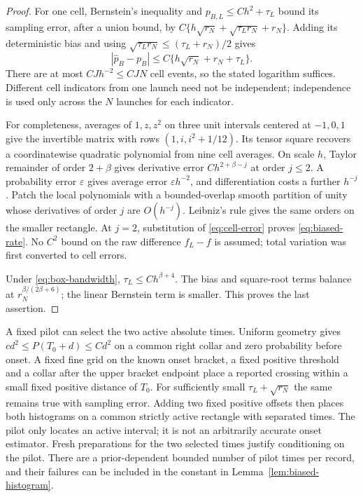 \begin{proof}
For one cell, Bernstein's inequality and
$p_{B,L}\le Ch^2+\tau_L$ bound its sampling error, after a union bound,
by $C\{h\sqrt{r_N}+\sqrt{\tau_Lr_N}+r_N\}$. Adding its deterministic
bias and using $\sqrt{\tau_Lr_N}\le(\tau_L+r_N)/2$ gives
\begin{equation}\label{eq:cell-error}
 |\widehat p_B-p_B|\le C\{h\sqrt{r_N}+r_N+\tau_L\}.
\end{equation}
There are at most $CJh^{-2}\le CJN$ cell events, so the stated logarithm
suffices. Different cell indicators from one launch need not be independent;
independence is used only across the $N$ launches for each indicator.

For completeness, averages of $1,z,z^2$ on three unit intervals centered
at $-1,0,1$ give the invertible matrix with rows $(1,i,i^2+1/12)$.
Its tensor square recovers a coordinatewise quadratic polynomial from
nine cell averages. On scale $h$, Taylor remainder of order $2+\beta$
gives derivative error $Ch^{2+\beta-j}$ at order $j\le2$.
A probability error $\varepsilon$ gives average error $\varepsilon h^{-2}$,
and differentiation costs a further $h^{-j}$. Patch the local polynomials
with a bounded-overlap smooth partition of unity whose derivatives of
order $j$ are $O(h^{-j})$. Leibniz's rule gives the same orders on the
smaller rectangle. At $j=2$, substitution of \eqref{eq:cell-error}
proves \eqref{eq:biased-rate}. No $C^2$ bound on the raw difference
$f_L-f$ is assumed; total variation was first converted to cell errors.

Under \eqref{eq:box-bandwidth}, $\tau_L\le C h^{\beta+4}$.
The bias and square-root terms balance at $r_N^{\beta/(2\beta+6)}$;
the linear Bernstein term is smaller. This proves the last assertion.
\end{proof}

A fixed pilot can select the two active absolute times. Uniform geometry
gives $cd^2\le P(T_0+d)\le Cd^2$ on a common right collar and zero
probability before onset. A fixed fine grid on the known onset bracket,
a fixed positive threshold and a collar after the upper bracket endpoint
place a reported crossing within a small fixed positive distance of $T_0$.
For sufficiently small $\tau_L+\sqrt{r_N}$ the same remains true with
sampling error. Adding two fixed positive offsets then places both
histograms on a common strictly active rectangle with separated times.
The pilot only locates an active interval; it is not an arbitrarily accurate
onset estimator. Fresh preparations for the two selected times justify
conditioning on the pilot. There are a prior-dependent bounded number
of pilot times per record, and their failures can be included in the
constant in Lemma~\ref{lem:biased-histogram}.
